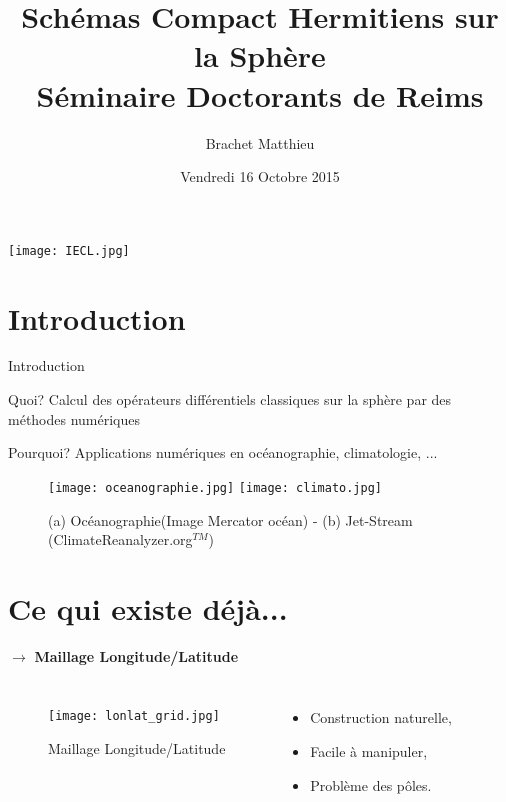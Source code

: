 \documentclass[11pt]{beamer}
\title{Schémas Compact Hermitiens sur la Sphère\\
Séminaire Doctorants de Reims}
\author{Brachet Matthieu}
\date[29.10.2015]{Vendredi 16 Octobre 2015}
\institute[IECL]{Institut Elie Cartan de Lorraine}
\begin{document}
\begin{frame}
\titlepage
\begin{center}
\texttt{[image: IECL.jpg]}
\end{center}
\end{frame}

\begin{frame}
\tableofcontents
\end{frame}

\section{Introduction}
\begin{frame}{Introduction}

\begin{exampleblock}{Quoi?}
Calcul des opérateurs différentiels classiques sur la sphère par des méthodes numériques
\end{exampleblock}
\pause
\begin{exampleblock}{Pourquoi?}
Applications numériques en océanographie, climatologie, ...
\end{exampleblock}

\begin{figure}
\begin{center}
\texttt{[image: oceanographie.jpg]}
\hspace{1cm}
\texttt{[image: climato.jpg]}
\end{center}
\caption{(a) Océanographie(Image Mercator océan) - (b) Jet-Stream (ClimateReanalyzer.org$^{TM}$)}
\end{figure}

\end{frame}


\section{Ce qui existe déjà...}
\begin{frame}
$\rightarrow$ \textbf{Maillage Longitude/Latitude}
\begin{columns}
\begin{figure}
\texttt{[image: lonlat\_grid.jpg]}
\caption{Maillage Longitude/Latitude}
\end{figure}
\pause
{}
\begin{itemize}
\item Construction naturelle,
\item Facile à manipuler,
\item Problème des pôles.
\end{itemize}
\end{columns}
\end{frame}
\end{document}
